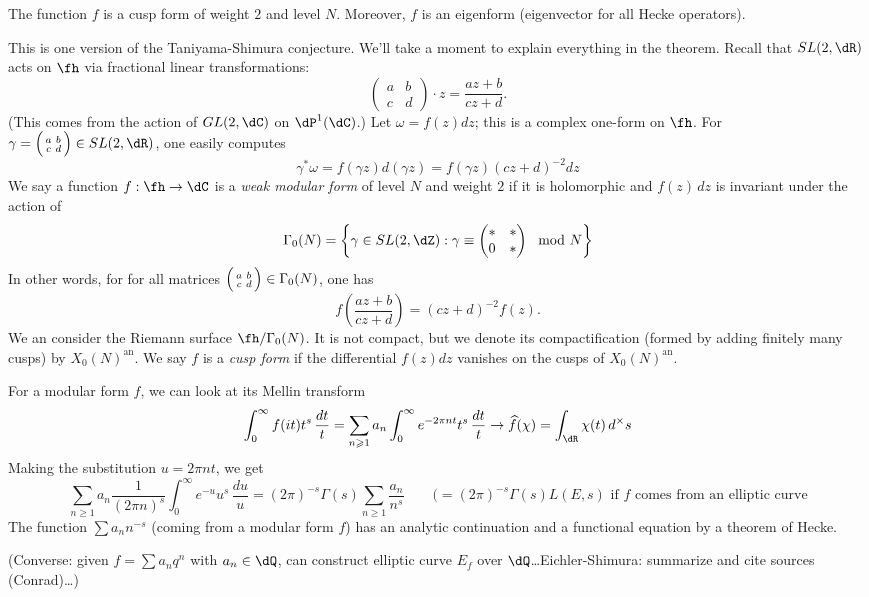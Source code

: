 \documentclass{article}
\begin{document}
\begin{theorem}
The function $f$ is a cusp form of weight $2$ and level $N$. Moreover, $f$ is 
an eigenform (eigenvector for all Hecke operators). 
\end{theorem}
This is one version of the Taniyama-Shimura conjecture. We'll take a moment to 
explain everything in the theorem. Recall that $SL(2,\dR)$ acts on $\fh$ 
via fractional linear transformations:
\[
  \begin{pmatrix} a & b \\ c & d\end{pmatrix}\cdot z = \frac{a z+b}{c z+d} \text{.}
\]
(This comes from the action of $GL(2,\dC)$ on $\dP^1(\dC)$.) Let 
$\omega=f(z)dz$; this is a complex one-form on $\fh$. For 
$\gamma=\smat a b c d\in SL(2,\dR)$, one easily computes 
\[
  \gamma^\ast \omega = f(\gamma z)d(\gamma z) = f(\gamma z)(c z+d)^{-2} dz 
\]
We say a function $f:\fh\to \dC$ is a \emph{weak modular form} of level $N$ and 
weight $2$ if it is holomorphic and $f(z)\, dz$ is invariant under the action of 
\[
  \Gamma_0(N) = \left\{\gamma \in SL(2,\dZ) : \gamma \equiv \begin{pmatrix} \ast & \ast \\ 0 & \ast \end{pmatrix} \mod N\right\}
\]
In other words, for for all matrices $\Big(\begin{smallmatrix} a & b \\ c & d \end{smallmatrix} \Big)\in\Gamma_0(N)$, one has 
\[
  f\left(\frac{a z+b}{c z+d}\right) = (c z+d)^{-2} f(z) \text{.}
\]
We an consider the Riemann surface $\fh/\Gamma_0(N)$. It is not compact, but we 
denote its compactification (formed by adding finitely many cusps) by 
$X_0(N)^\text{an}$. We say $f$ is a \emph{cusp form} if the differential 
$f(z) dz$ vanishes on the cusps of $X_0(N)^\text{an}$. 

For a modular form $f$, we can look at its Mellin transform 
\[
  \int_0^\infty f(i t) t^s\, \frac{dt}{t}  = \sum_{n\geqslant 1} a_n \int_0^\infty e^{-2\pi n t} t^s\, \frac{dt}{t}
  \to \widehat f(\chi) = \int_\dR \chi(t)\, d^\times s
\]
Making the substitution $u=2\pi n t$, we get 
\[
  \sum_{n\geqslant 1} a_n \frac{1}{(2\pi n)^s} \int_0^\infty e^{-u} u^s\, \frac{du}{u}
    = (2\pi)^{-s} \Gamma(s) \sum_{n\geqslant 1} \frac{a_n}{n^s} \qquad (= (2\pi)^{-s} \Gamma(s) L(E,s) \text{ if $f$ comes from an elliptic curve}
\]
The function $\sum a_n n^{-s}$ (coming from a modular form $f$) has an analytic 
continuation and a functional equation by a theorem of Hecke. 

(Converse: given $f=\sum a_n q^n$ with $a_n\in \dQ$, can construct elliptic curve 
$E_f$ over $\dQ$\ldots Eichler-Shimura: summarize and cite sources (Conrad)\ldots)
\end{document}
